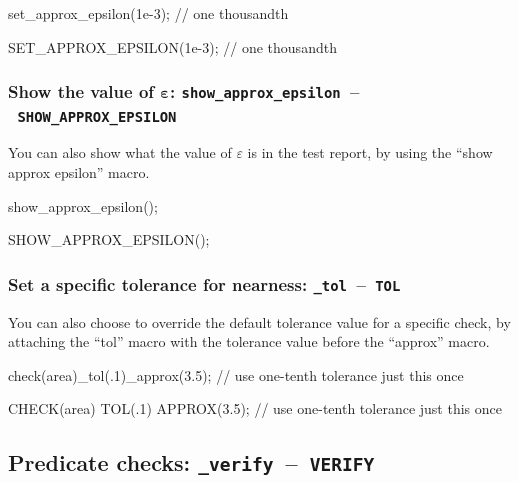 \documentclass[twoside, a4paper, article]{memoir}
\newcommand*\testudocolor{\color{red!80!blue}}
\newcommand*\testudo[1]{\texttt{\testudocolor{}#1}}
\newcommand*\testudopair[2]{\testudo{#1}~--~\testudo{#2}}
\begin{document}
\begin{cpplisting}
set_approx_epsilon(1e-3); // one thousandth
\end{cpplisting}

\begin{cpplisting}
SET_APPROX_EPSILON(1e-3); // one thousandth
\end{cpplisting}

\subsubsection{Show the value of $\bm{\varepsilon}$:
  \testudopair{show\_approx\_epsilon}{SHOW\_APPROX\_EPSILON}}
\label{sec:show-value-epsilon}

You can also show what the value of $\varepsilon$ is in the test report, by
using the ``show approx epsilon'' macro.

\begin{cpplisting}
show_approx_epsilon();
\end{cpplisting}

\begin{cpplisting}
SHOW_APPROX_EPSILON();
\end{cpplisting}

\subsubsection{Set a specific tolerance for nearness:
  \testudopair{\_tol}{TOL}}
\label{sec:specify-tolerance-nearness}

You can also choose to override the default tolerance value for a specific
check, by attaching the ``tol'' macro with the tolerance value before the
``approx'' macro.

\begin{cpplisting}
check(area)_tol(.1)_approx(3.5); // use one-tenth tolerance just this once
\end{cpplisting}

\begin{cpplisting}
CHECK(area) TOL(.1) APPROX(3.5); // use one-tenth tolerance just this once
\end{cpplisting}


\subsection{Predicate checks: \testudopair{\_verify}{VERIFY}}
\label{sec:predicate-checks}
\end{document}
